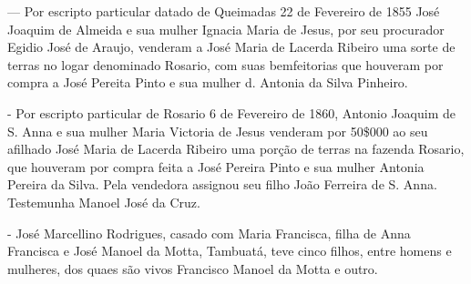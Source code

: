 — Por escripto particular datado de Queimadas 22 de Fevereiro de 1855 José Joaquim de Almeida e sua mulher Ignacia Maria de Jesus, por seu procurador Egidio José de Araujo, venderam a José Maria de Lacerda Ribeiro uma sorte de terras no logar denominado Rosario, com suas bemfeitorias que houveram por compra a José Pereita Pinto e sua mulher d. Antonia da Silva Pinheiro.

- Por escripto particular de Rosario 6 de Fevereiro de 1860, Antonio Joaquim de S. Anna e sua mulher Maria Victoria de Jesus venderam por 50\$000 ao seu afilhado José Maria de Lacerda Ribeiro  uma porção de terras na fazenda Rosario, que houveram por compra feita a José Pereira Pinto e sua mulher Antonia Pereira da Silva. Pela vendedora assignou seu filho  João Ferreira  de S. Anna. Testemunha Manoel José da  Cruz.

- José Marcellino Rodrigues, casado com Maria Francisca, filha de Anna Francisca e José Manoel da Motta, Tambuatá, teve cinco filhos, entre homens e mulheres, dos quaes são vivos Francisco Manoel da Motta e outro.

